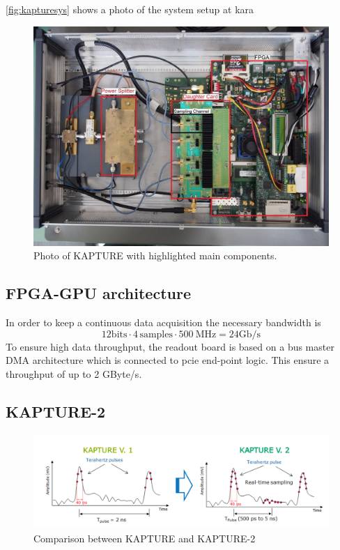 \autoref{fig:kapturesys} shows a photo of the system setup at \gls{kara}
\begin{figure}[tbh]
	\centering
	\includegraphics[width = \textwidth]{chap/03-currentStat/img/kapture_sys}
	\caption{Photo of KAPTURE with highlighted main components. \cite[p.~61]{brosi}}
	\label{fig:kapturesys}
\end{figure}

\subsection{FPGA-GPU architecture}

In order to keep a continuous data acquisition the necessary bandwidth is 
\begin{equation}
	12 \text{bits} \cdot 4 \, \text{samples} \cdot \SI{500}{\mega \hertz} = 24 \text{Gb/s}
\end{equation}
To ensure high data throughput, the readout board is based on a bus master DMA architecture which is connected to \gls{pcie} end-point logic. This ensure a throughput of up to 2 GByte/s. \cite{caselleKAP}

\subsection{KAPTURE-2}

\begin{figure}[tbh]
	\centering
	\includegraphics[width = \textwidth]{chap/03-currentStat/img/kap1_vs_kap2}
	\caption{Comparison between KAPTURE and KAPTURE-2\cite{caselleKAP}}
	\label{fig:kap1vskap2}
\end{figure}

